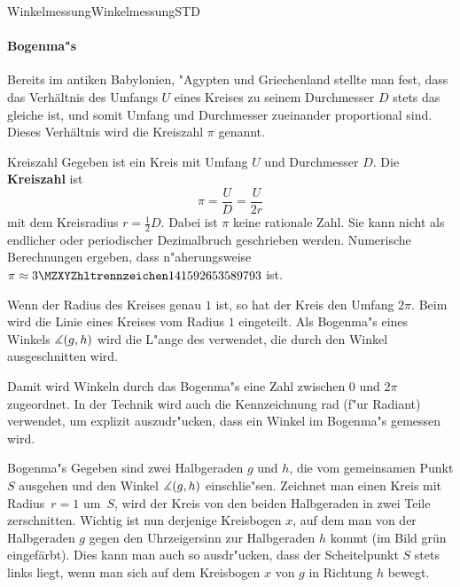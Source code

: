 \begin{MXContent}{Winkelmessung}{Winkelmessung}{STD}
\paragraph{Bogenma"s}
Bereits im antiken Babylonien, "Agypten und Griechenland stellte man fest, 
dass das Verh\"altnis des Umfangs $U$ eines Kreises zu seinem Durchmesser 
$D$ stets das gleiche ist, und somit Umfang und Durchmesser zueinander 
proportional sind.
Dieses Verh\"altnis wird die Kreiszahl $\pi$ genannt. 
\begin{MXInfo}{Kreiszahl}%
Gegeben ist ein Kreis mit Umfang $U$ und Durchmesser $D$.
Die \textbf{Kreiszahl} ist
\[
\pi = \frac{U}{D} = \frac{U}{2r} %
\]
mit dem Kreisradius $r = \frac{1}{2} D$.
Dabei ist $\pi$ keine rationale Zahl. Sie kann nicht als endlicher oder 
periodischer Dezimalbruch geschrieben werden. Numerische Berechnungen ergeben,
dass n"aherungsweise $\pi \approx \MZahl{3}{141592653589793}$ ist.
\end{MXInfo}

Wenn der Radius des Kreises genau $1$ ist, so hat der Kreis den Umfang $2\pi$. 
Beim  wird die Linie eines Kreises vom Radius $1$
eingeteilt.
Als Bogenma"s eines Winkels $\measuredangle(g,h)$ wird die L"ange des 
 verwendet, die durch den Winkel 
{\glqq}ausgeschnitten{\grqq} wird.

Damit wird Winkeln durch das Bogenma"s eine Zahl zwischen $0$ und $2\pi$ 
zugeordnet. In der Technik wird auch die Kennzeichnung rad (f"ur Radiant)
verwendet, um explizit auszudr"ucken, dass ein Winkel im Bogenma"s gemessen
wird.

\begin{MXInfo}{Bogenma"s}%
Gegeben sind zwei Halbgeraden $g$ und $h$, die vom gemeinsamen Punkt $S$
ausgehen und den Winkel $\measuredangle(g,h)$ einschlie"sen.
Zeichnet man einen Kreis mit Radius~$r = 1$ um~$S$, wird der Kreis von den 
beiden Halbgeraden in zwei Teile zerschnitten. Wichtig ist nun derjenige 
Kreisbogen $x$, auf dem man von der Halbgeraden $g$ gegen den Uhrzeigersinn 
zur Halbgeraden $h$ kommt (im Bild gr\"un eingef\"arbt). Dies kann man auch 
so ausdr"ucken, dass der Scheitelpunkt $S$ stets links liegt, 
wenn man sich auf dem Kreisbogen $x$ von $g$ in Richtung $h$ bewegt.


\end{MXInfo}
\end{MXContent}
